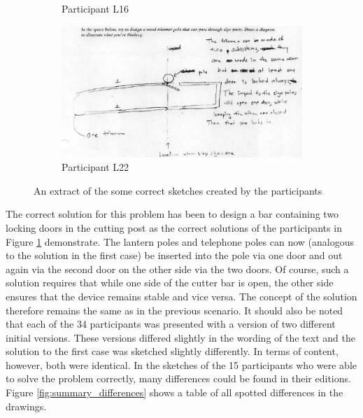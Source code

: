 \documentclass[12pt]{article}
\begin{document}
\begin{figure}[h!]
\begin{subfigure}[b]{0.3\linewidth}
    \caption{Participant L16}
  \end{subfigure}
  \begin{subfigure}[b]{0.3\linewidth}
    \includegraphics[width=\linewidth]{images/drawing_l22_con2.PNG}
    \caption{Participant L22}
  \end{subfigure}
  \caption{An extract of the some correct sketches created by the participants}
  \label{fig:drawing_l24_con2}
\end{figure}

The correct solution for this problem has been to design a bar containing two locking doors in the cutting post as the correct solutions of the participants in Figure \ref{fig:drawing_l24_con2} demonstrate. The lantern poles and telephone poles can now (analogous to the solution in the first case) be inserted into the pole via one door and out again via the second door on the other side via the two doors. Of course, such a solution requires that while one side of the cutter bar is open, the other side ensures that the device remains stable and vice versa. The concept of the solution therefore remains the same as in the previous scenario. It should also be noted that each of the 34 participants was presented with a version of two different initial versions. These versions differed slightly in the wording of the text and the solution to the first case was sketched slightly differently. In terms of content, however, both were identical. In the sketches of the 15 participants who were able to solve the problem correctly, many differences could be found in their editions. Figure \ref{fig:summary_differences} shows a table of all spotted differences in the drawings. 
\end{document}
